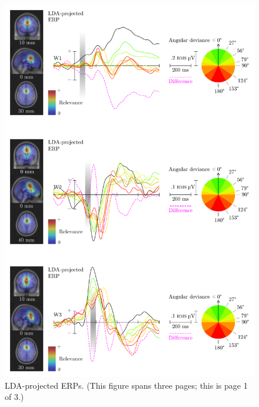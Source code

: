\begin{figure}[p]
    \renewcommand\thefigure{\ref{chapter:nat}.S5.1}
    \centering
    \includegraphics[width=\textwidth]{figures/nat-app-fig-s5-1.pdf}
    \caption{LDA-projected ERPs. (This figure spans three pages; this is page 1 of 3.)}
\end{figure}

